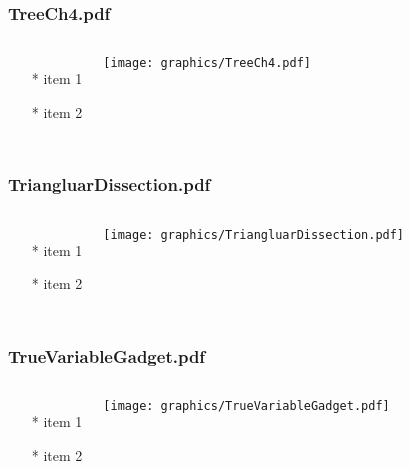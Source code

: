 \documentclass{beamer}
\begin{document}
\begin{frame} \frametitle{TreeCh4.pdf}
    \begin{columns}[c]
        \begin{itemize}
            \item[*] item 1
            \item[*] item 2
        \end{itemize}
        \begin{minipage}{\linewidth}
            \begin{center}
            \texttt{[image: graphics/TreeCh4.pdf]}
            \label{gfx:TreeCh4.pdf}
            \end{center}
        \end{minipage}
    \end{columns}
\end{frame}
\begin{frame} \frametitle{TriangluarDissection.pdf}
    \begin{columns}[c]
        \begin{itemize}
            \item[*] item 1
            \item[*] item 2
        \end{itemize}
        \begin{minipage}{\linewidth}
            \begin{center}
            \texttt{[image: graphics/TriangluarDissection.pdf]}
            \label{gfx:TriangluarDissection.pdf}
            \end{center}
        \end{minipage}
    \end{columns}
\end{frame}
\begin{frame} \frametitle{TrueVariableGadget.pdf}
    \begin{columns}[c]
        \begin{itemize}
            \item[*] item 1
            \item[*] item 2
        \end{itemize}
        \begin{minipage}{\linewidth}
            \begin{center}
            \texttt{[image: graphics/TrueVariableGadget.pdf]}
            \label{gfx:TrueVariableGadget.pdf}
            \end{center}
        \end{minipage}
    \end{columns}
\end{frame}
\end{document}
